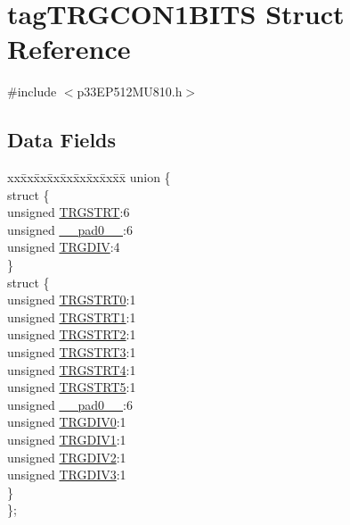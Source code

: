\hypertarget{structtag_t_r_g_c_o_n1_b_i_t_s}{}\section{tag\+T\+R\+G\+C\+O\+N1\+B\+I\+TS Struct Reference}
\label{structtag_t_r_g_c_o_n1_b_i_t_s}


{\ttfamily \#include $<$p33\+E\+P512\+M\+U810.\+h$>$}

\subsection*{Data Fields}
\begin{DoxyCompactItemize}
\item 
\begin{tabbing}
xx\=xx\=xx\=xx\=xx\=xx\=xx\=xx\=xx\=\kill
union \{\\
\>struct \{\\
\>\>unsigned \hyperlink{structtag_t_r_g_c_o_n1_b_i_t_s_a53d84dcc3e23b3d2db356ea32c245b6f}{TRGSTRT}:6\\
\>\>unsigned \hyperlink{structtag_t_r_g_c_o_n1_b_i_t_s_adf71f3d8410c1f1dbbc96680a92c49af}{\_\_pad0\_\_}:6\\
\>\>unsigned \hyperlink{structtag_t_r_g_c_o_n1_b_i_t_s_a10310cfb772e07d5f62911d0619c3ae0}{TRGDIV}:4\\
\>\} \\
\>struct \{\\
\>\>unsigned \hyperlink{structtag_t_r_g_c_o_n1_b_i_t_s_a75147b4831d3afa487fe9999d2a58c67}{TRGSTRT0}:1\\
\>\>unsigned \hyperlink{structtag_t_r_g_c_o_n1_b_i_t_s_ac76b84548f8cfa382a2d703890b58dad}{TRGSTRT1}:1\\
\>\>unsigned \hyperlink{structtag_t_r_g_c_o_n1_b_i_t_s_a66e40dba969f7a5eafe81b8f341dd665}{TRGSTRT2}:1\\
\>\>unsigned \hyperlink{structtag_t_r_g_c_o_n1_b_i_t_s_a20e528d9be27fc91e2d28bb69f809c0a}{TRGSTRT3}:1\\
\>\>unsigned \hyperlink{structtag_t_r_g_c_o_n1_b_i_t_s_a9e26684d05dfb877c150795a627387cc}{TRGSTRT4}:1\\
\>\>unsigned \hyperlink{structtag_t_r_g_c_o_n1_b_i_t_s_aabeb06bb6258310e01e1a0cd96bf30ca}{TRGSTRT5}:1\\
\>\>unsigned \hyperlink{structtag_t_r_g_c_o_n1_b_i_t_s_adf71f3d8410c1f1dbbc96680a92c49af}{\_\_pad0\_\_}:6\\
\>\>unsigned \hyperlink{structtag_t_r_g_c_o_n1_b_i_t_s_a6d425374bc65bb89be540344ef5393e5}{TRGDIV0}:1\\
\>\>unsigned \hyperlink{structtag_t_r_g_c_o_n1_b_i_t_s_a92a66ed2923cfb0f855e3d9fe36654f9}{TRGDIV1}:1\\
\>\>unsigned \hyperlink{structtag_t_r_g_c_o_n1_b_i_t_s_a8a4ec980bd7f8bdb174f00a7888cdfce}{TRGDIV2}:1\\
\>\>unsigned \hyperlink{structtag_t_r_g_c_o_n1_b_i_t_s_a0b99e8f3f8539f9bf133127a32824612}{TRGDIV3}:1\\
\>\} \\
\}; \\


\end{tabbing}
\end{DoxyCompactItemize}
